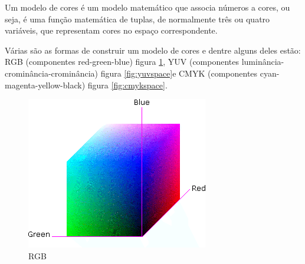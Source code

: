 Um modelo de cores é um modelo matemático que associa números a cores, ou seja, é uma função matemática de tuplas, de normalmente três ou quatro variáveis, que representam cores no espaço correspondente.

Várias são as formas de construir um modelo de cores e dentre alguns deles estão: RGB (componentes red-green-blue) figura \ref{fig:rgbspace}, YUV (componentes luminância-crominância-crominância) figura \ref{fig:yuvspace}e CMYK (componentes cyan-magenta-yellow-black) figura \ref{fig:cmykspace}.

\begin{figure}[ht]
    \begin{minipage}[b]{0.3\linewidth}
        \centering
        \includegraphics[width=\textwidth]{./imgs/rgbspace.png}
        \caption{RGB}
        \label{fig:rgbspace}
    \end{minipage}
    \hspace{0.5cm}
    \begin{minipage}[b]{0.3\linewidth}
        \centering

\end{minipage}
\end{figure}
